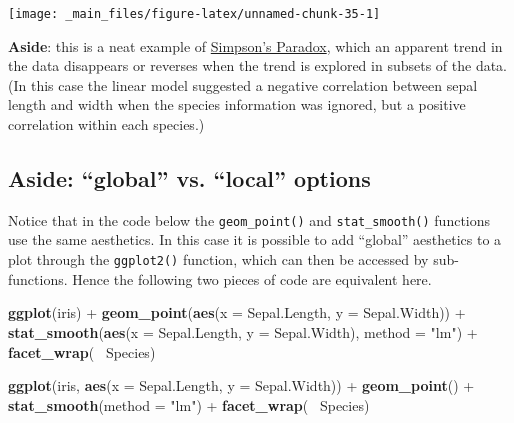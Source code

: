 \documentclass[]{book}
\newenvironment{Shaded}{\begin{snugshade}}{\end{snugshade}}
\newcommand{\KeywordTok}[1]{\textcolor[rgb]{0.13,0.29,0.53}{\textbf{{#1}}}}
\newcommand{\DataTypeTok}[1]{\textcolor[rgb]{0.13,0.29,0.53}{{#1}}}
\newcommand{\StringTok}[1]{\textcolor[rgb]{0.31,0.60,0.02}{{#1}}}
\newcommand{\NormalTok}[1]{{#1}}
\theoremstyle{definition}
\theoremstyle{definition}
\theoremstyle{definition}
\theoremstyle{remark}
\begin{document}
\begin{center}\texttt{[image: \_main\_files/figure-latex/unnamed-chunk-35-1]} \end{center}

\textbf{Aside}: this is a neat example of
\href{https://en.wikipedia.org/wiki/Simpson\%27s_paradox}{Simpson's
Paradox}, which an apparent trend in the data disappears or reverses
when the trend is explored in subsets of the data. (In this case the
linear model suggested a negative correlation between sepal length and
width when the species information was ignored, but a positive
correlation within each species.)

\subsection{\texorpdfstring{\textbf{Aside}: ``global'' vs. ``local''
options}{Aside: global vs. local options}}\label{aside-global-vs.-local-options}

Notice that in the code below the \texttt{geom\_point()} and
\texttt{stat\_smooth()} functions use the same aesthetics. In this case
it is possible to add ``global'' aesthetics to a plot through the
\texttt{ggplot2()} function, which can then be accessed by
sub-functions. Hence the following two pieces of code are equivalent
here.

\begin{Shaded}
\begin{Highlighting}[]
\KeywordTok{ggplot}\NormalTok{(iris) +}
\StringTok{    }\KeywordTok{geom_point}\NormalTok{(}\KeywordTok{aes}\NormalTok{(}\DataTypeTok{x =} \NormalTok{Sepal.Length, }\DataTypeTok{y =} \NormalTok{Sepal.Width)) +}
\StringTok{    }\KeywordTok{stat_smooth}\NormalTok{(}\KeywordTok{aes}\NormalTok{(}\DataTypeTok{x =} \NormalTok{Sepal.Length, }\DataTypeTok{y =} \NormalTok{Sepal.Width), }\DataTypeTok{method =} \StringTok{"lm"}\NormalTok{) +}
\StringTok{    }\KeywordTok{facet_wrap}\NormalTok{(~}\StringTok{ }\NormalTok{Species)}
\end{Highlighting}
\end{Shaded}

\begin{Shaded}
\begin{Highlighting}[]
\KeywordTok{ggplot}\NormalTok{(iris, }\KeywordTok{aes}\NormalTok{(}\DataTypeTok{x =} \NormalTok{Sepal.Length, }\DataTypeTok{y =} \NormalTok{Sepal.Width)) +}
\StringTok{    }\KeywordTok{geom_point}\NormalTok{() +}
\StringTok{    }\KeywordTok{stat_smooth}\NormalTok{(}\DataTypeTok{method =} \StringTok{"lm"}\NormalTok{) +}
\StringTok{    }\KeywordTok{facet_wrap}\NormalTok{(~}\StringTok{ }\NormalTok{Species)}
\end{Highlighting}
\end{Shaded}
\end{document}
